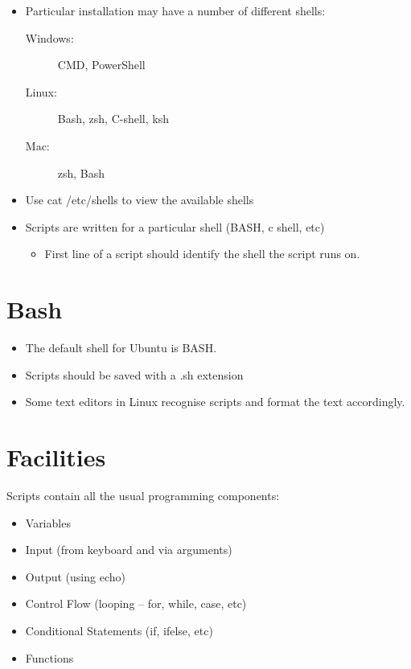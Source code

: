 \documentclass[slides]{pgnotes}
\begin{document}
\begin{itemize}
\item
  Particular installation may have a number of different shells:
  \begin{description}
  \item[Windows:] CMD, PowerShell
  \item[Linux:] Bash, zsh, C-shell, ksh
  \item[Mac:] zsh, Bash
  \end{description}
\item
  Use cat /etc/shells to view the available shells    
\item
  Scripts are written for a particular shell (BASH, c shell, etc)
  \begin{itemize}
  \item
    First line of a script should identify the shell the script runs  on.
  \end{itemize}
\end{itemize}

\section{Bash}

\begin{itemize}
\item
  The default shell for Ubuntu is BASH.
\item
  Scripts should be saved with a .sh extension
\item
  Some text editors in Linux recognise scripts and format the text  accordingly.
\end{itemize}

\section{Facilities}\label{script-contents}

Scripts contain all the usual programming components:

\begin{itemize}
\item
  Variables
\item
  Input (from keyboard and via arguments)
\item
  Output (using echo)
\item
  Control Flow (looping -- for, while, case, etc)
\item
  Conditional Statements (if, ifelse, etc)
\item
  Functions
\end{itemize}
\end{document}

